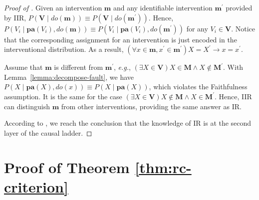 \begin{proof}[Proof of ]
	Given an intervention $\mathbf{m}$ and any identifiable intervention $\mathbf{m}^{\prime}$ provided by IIR, $P(\mathbf{V} \mid do(\mathbf{m})) \equiv P(\mathbf{V} \mid do(\mathbf{m}^{\prime}))$.
	Hence, $P(V_{i} \mid \mathbf{pa}(V_{i}), do(\mathbf{m})) \equiv P(V_{i} \mid \mathbf{pa}(V_{i}), do(\mathbf{m}^{\prime}))$ for any $V_{i} \in \mathbf{V}$.
	Notice that the corresponding assignment for an intervention is just encoded in the interventional distribution.
	As a result, $(\forall x \in \mathbf{m}, x^{\prime} \in \mathbf{m}^{\prime}) X=X^{\prime} \rightarrow x=x^{\prime}$.

	Assume that $\mathbf{m}$ is different from $\mathbf{m}^{\prime}$, \textit{e.g.}, $(\exists X \in \mathbf{V}) X \in \mathbf{M} \wedge X \notin \mathbf{M}^{\prime}$.
	With Lemma~\ref{lemma:decompose-fault}, we have $P(X \mid \mathbf{pa}(X), do(x)) \equiv P(X \mid \mathbf{pa}(X))$, which violates the Faithfulness assumption.
	It is the same for the case $(\exists X \in \mathbf{V}) X \notin \mathbf{M} \wedge X \in \mathbf{M}^{\prime}$.
	Hence, IIR can distinguish $\mathbf{m}$ from other interventions, providing the same answer as IR.

	According to , we reach the conclusion that the knowledge of IR is at the second layer of the causal ladder.
\end{proof}

\section{Proof of Theorem \ref{thm:rc-criterion}}\label{sec:proof-rc-criterion}

